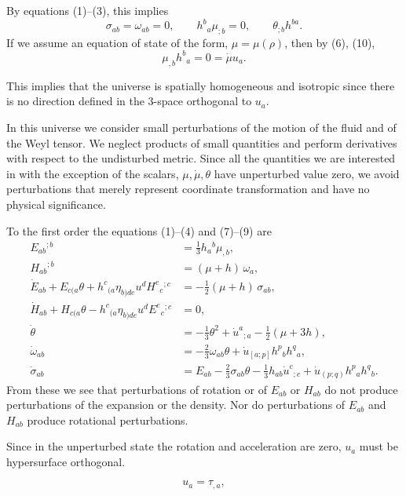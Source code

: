 By equations (1)–(3), this implies
\[
\sigma_{ab} = \omega_{ab} = 0, 
\qquad h^{b}{}_{a} \mu_{;b} = 0, 
\qquad \theta_{;b} h^{ba}.
\]
If we assume an equation of state of the form, $\mu = \mu(\rho)$,  
then by (6), (10),
\[
\mu_{,b} h^{b}{}_{a} = 0 = \dot{\mu} u_{a}.
\]

This implies that the universe is spatially homogeneous and isotropic 
since there is no direction defined in the 3-space orthogonal to $u_{a}$.

In this universe we consider small perturbations of the motion 
of the fluid and of the Weyl tensor. We neglect products of small 
quantities and perform derivatives with respect to the undisturbed 
metric. Since all the quantities we are interested in with the 
exception of the scalars, $\mu, \dot{\mu}, \theta$ have unperturbed value zero, we 
avoid perturbations that merely represent coordinate transformation 
and have no physical significance.

To the first order the equations (1)–(4) and (7)–(9) are
\begin{align}
E_{ab}{}^{;b} &= \tfrac{1}{3} h_{a}{}^{b} \mu_{,b}, \tag{13}\\
H_{ab}{}^{;b} &= (\mu + h)\, \omega_{a}, \tag{14}\\
\dot{E}_{ab} + E_{c(a}\theta + h^{c}{}_{(a}\eta_{b)de}u^{d}H^{e}{}_{c}{}^{;c} 
  &= -\tfrac{1}{2}(\mu + h)\,\sigma_{ab}, \tag{15}\\
\dot{H}_{ab} + H_{c(a}\theta - h^{c}{}_{(a}\eta_{b)de}u^{d}E^{e}{}_{c}{}^{;c} &= 0, \tag{16}\\
\dot{\theta} &= -\tfrac{1}{3}\theta^{2} + \dot{u}^{a}{}_{;a} - \tfrac{1}{2}(\mu + 3h), \tag{17}\\
\dot{\omega}_{ab} &= -\tfrac{2}{3}\omega_{ab}\theta + \dot{u}_{[a;p]} h^{p}{}_{b} h^{q}{}_{a}, \tag{18}\\
\dot{\sigma}_{ab} &= E_{ab} - \tfrac{2}{3}\sigma_{ab}\theta - \tfrac{1}{3}h_{ab}\dot{u}^{c}{}_{;c}
   + \dot{u}_{(p;q)} h^{p}{}_{a} h^{q}{}_{b}. \tag{19}
\end{align}
From these we see that perturbations of rotation or of $E_{ab}$ or $H_{ab}$ do 
not produce perturbations of the expansion or the density. Nor do 
perturbations of $E_{ab}$ and $H_{ab}$ produce rotational perturbations.  


Since in the unperturbed state the rotation and acceleration 
are zero, $u_{a}$ must be hypersurface orthogonal.

\[
u_{a} = \tau_{,a},
\]

